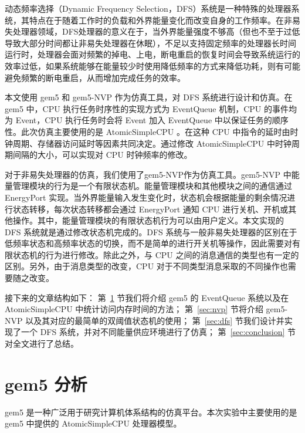 \documentclass[a4paper,titlepage]{report}
\begin{document}
动态频率选择（Dynamic Frequency Selection，DFS）系统是一种特殊的处理器系统，其特点在于随着工作时的负载和外界能量变化而改变自身的工作频率。在非易失处理器领域，DFS处理器的意义在于，当外界能量强度不够高（但也不至于过低导致大部分时间都让非易失处理器在休眠），不足以支持固定频率的处理器长时间运行时，处理器会面对频繁的掉电、上电，断电重启的恢复时间会导致系统运行的效率过低，如果系统能够在能量较少时使用降低频率的方式来降低功耗，则有可能避免频繁的断电重启，从而增加完成任务的效率。

本文使用 gem5 和 gem5-NVP 作为仿真工具，对 DFS 系统进行设计和仿真。在 gem5 中，CPU 执行任务时序性的实现方式为 EventQueue 机制，CPU 的事件均为 Event，CPU 执行任务时会将 Event 加入 EventQueue 中以保证任务的顺序性。此次仿真主要使用的是 AtomicSimpleCPU 。在这种 CPU 中指令的延时由时钟周期、存储器访问延时等因素共同决定。通过修改 AtomicSimpleCPU 中时钟周期间隔的大小，可以实现对 CPU 时钟频率的修改。

对于非易失处理器的仿真，我们使用了gem5-NVP作为仿真工具。gem5-NVP 中能量管理模块的行为是一个有限状态机。能量管理模块和其他模块之间的通信通过 EnergyPort 实现。当外界能量输入发生变化时，状态机会根据能量的剩余情况进行状态转移，每次状态转移都会通过 EnergyPort 通知 CPU 进行关机、开机或其他操作。其中，能量管理模块的有限状态机行为可以由用户定义。本文实现的 DFS 系统就是通过修改状态机完成的。DFS 系统与一般非易失处理器的区别在于低频率状态和高频率状态的切换，而不是简单的进行开关机等操作，因此需要对有限状态机的行为进行修改。除此之外，与 CPU 之间的消息通信的类型也有一定的区别。另外，由于消息类型的改变，CPU 对于不同类型消息采取的不同操作也需要随之改变。

接下来的文章结构如下：
第~\ref{sec:gem5} 节我们将介绍 gem5 的 EventQueue 系统以及在AtomicSimpleCPU 中统计访问内存时间的方法；
第~\ref{sec:nvp} 节将介绍 gem5-NVP 以及其对应的最简单的双阈值状态机的使用；
第~\ref{sec:dfs} 节我们设计并实现了一个 DFS 系统，并对不同能量供应环境进行了仿真；
第~\ref{sec:conclusion} 节对全文进行了总结。


\section{gem5 分析} \label{sec:gem5}

gem5 \cite{binkert2011gem5} 是一种广泛用于研究计算机体系结构的仿真平台。本次实验中主要使用的是 gem5 中提供的 AtomicSimpleCPU 处理器模型。
\end{document}
